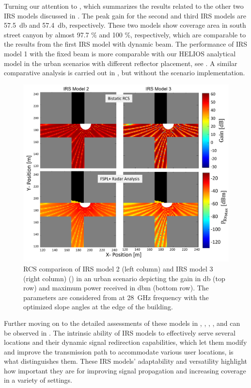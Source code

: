 Turning our attention to , which summarizes the results related to the other two IRS models discussed in . The peak gain for the second and third IRS models are \SI{57.5}{\decibel} and \SI{57.4}{\decibel}, respectively. These two models show coverage area in south street canyon by almost \num{97.7} \% and \num{100} \%, respectively, which are comparable to the results from the first IRS model with dynamic beam. The performance of IRS model 1 with the fixed beam is more comparable with our HELIOS analytical model in the urban scenarios with different reflector placement, see . A similar comparative analysis is carried out in , but without the scenario implementation. 

\begin{figure}[H]
	\centering
	\includegraphics[width=0.8\linewidth]{images/Section 4 Images/urbanscenario_IRSmodel2_3}
	\caption{RCS comparison of IRS model 2 (left column) and IRS model 3 (right column) () in an urban scenario depicting the gain in \si{\decibel} (top row) and maximum power received in \si{\decibel}m (bottom row). The parameters are considered from  at \SI{28}{\giga\hertz} frequency with the optimized slope angles at the edge of the building.}
	\label{fig:urbanscenario_IRSmodel2_3}
\end{figure}

Further moving on to the detailed assessments of these models in , , , , and  can be observed in . The intrinsic ability of IRS models to effectively serve several locations and their dynamic signal redirection capabilities, which let them modify and improve the transmission path to accommodate various user locations, is what distinguishes them. These IRS models' adaptability and versatility highlight how important they are for improving signal propagation and increasing coverage in a variety of settings.
